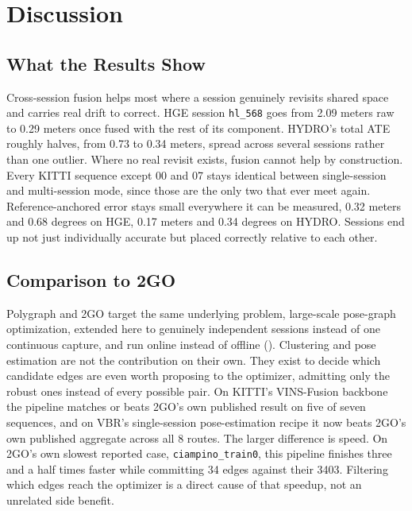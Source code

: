 %
\chapter{Discussion}
\label{chap:discussion}

\section{What the Results Show}
\label{sec:discussion-results}

Cross-session fusion helps most where a session genuinely revisits shared space and carries real
drift to correct. HGE session \texttt{hl\_568} goes from 2.09 meters raw to 0.29 meters once fused
with the rest of its component. HYDRO's total ATE roughly halves, from 0.73 to 0.34 meters, spread
across several sessions rather than one outlier. Where no real revisit exists, fusion cannot help
by construction. Every KITTI sequence except 00 and 07 stays identical between single-session and
multi-session mode, since those are the only two that ever meet again. Reference-anchored error
stays small everywhere it can be measured, 0.32 meters and 0.68 degrees on HGE, 0.17 meters and
0.34 degrees on HYDRO. Sessions end up not just individually accurate but placed correctly
relative to each other.

\section{Comparison to 2GO}
\label{sec:discussion-2go}

Polygraph and 2GO \cite{lim2025twogo} target the same underlying problem, large-scale pose-graph
optimization, extended here to genuinely independent sessions instead of one continuous capture,
and run online instead of offline (). Clustering and pose estimation
are not the contribution on their own. They exist to decide which candidate edges are even worth
proposing to the optimizer, admitting only the robust ones instead of every possible pair. On
KITTI's VINS-Fusion backbone the pipeline matches or beats 2GO's own published result on five of
seven sequences, and on VBR's single-session pose-estimation recipe it now beats 2GO's own
published aggregate across all 8 routes. The larger difference is speed. On 2GO's own slowest
reported case, \texttt{ciampino\_train0}, this pipeline finishes three and a half times faster
while committing 34 edges against their 3403. Filtering which edges reach the optimizer is a
direct cause of that speedup, not an unrelated side benefit.

